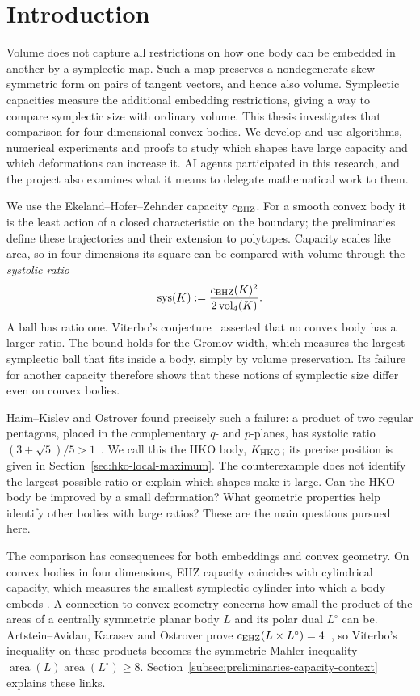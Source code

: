 \section{Introduction}\label{sec:introduction}

Volume does not capture all restrictions on how one body can be embedded
in another by a symplectic map. Such a map preserves a nondegenerate
skew-symmetric form on pairs of tangent vectors, and hence also volume.
Symplectic capacities measure the additional embedding
restrictions, giving a way to compare symplectic size with ordinary volume.
This thesis investigates that comparison for four-dimensional convex
bodies. We develop and use algorithms, numerical experiments and proofs
to study which shapes have large capacity and which deformations can
increase it. AI agents participated in this research, and the project also
examines what it means to delegate mathematical work to them.

We use the Ekeland--Hofer--Zehnder capacity $c_{\rm EHZ}$. For a smooth
convex body it is the least action of a closed characteristic on the
boundary; the preliminaries define these trajectories and their extension
to polytopes. Capacity scales like area, so in four dimensions its square
can be compared with volume through the \emph{systolic ratio}
\[
 \operatorname{sys}(K):=
 \frac{c_{\rm EHZ}(K)^2}{2\operatorname{vol}_4(K)}.
\]
A ball has ratio one. Viterbo's conjecture~\cite{Viterbo2000} asserted that
no convex body has a larger ratio. The bound holds for the Gromov width,
which measures the largest symplectic ball that fits inside a body, simply
by volume preservation. Its failure for another capacity therefore shows
that these notions of symplectic size differ even on convex bodies.

Haim--Kislev and Ostrover found precisely such a failure: a product of two
regular pentagons, placed in the complementary $q$- and $p$-planes, has
systolic ratio $(3+\sqrt5)/5>1$~\cite{HaimKislevOstrover2024}.
We call this the HKO body, $K_{\rm HKO}$; its precise position is given in
Section~\ref{sec:hko-local-maximum}. The counterexample does not identify
the largest possible ratio or explain which shapes make it large. Can the
HKO body be improved by a small deformation? What geometric properties
help identify other bodies with large ratios? These are the main questions
pursued here.

The comparison has consequences for both embeddings and convex geometry.
On convex bodies in four dimensions, EHZ capacity coincides with cylindrical capacity,
which measures the smallest symplectic cylinder into which a body embeds
\cite[Corollary~1]{AbbondandoloEdtmairKang2024}. A connection to convex
geometry concerns how small the product of the areas of a centrally
symmetric planar body $L$ and its polar dual $L^\circ$ can be.
Artstein--Avidan, Karasev and Ostrover prove
$c_{\rm EHZ}(L\times L^\circ)=4$~\cite{AKO2014}, so Viterbo's inequality
on these products becomes the symmetric Mahler inequality
$\operatorname{area}(L)\operatorname{area}(L^\circ)\geq8$.
Section~\ref{subsec:preliminaries-capacity-context} explains these links.

